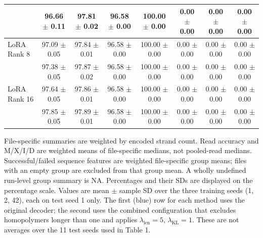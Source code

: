 \documentclass[10pt,letterpaper]{article}
\begin{document}
\begin{table}[!htb]
{\begin{tabular}{lccccccc}
 & 96.66 $\pm$ 0.11 & 97.81 $\pm$ 0.02 & 96.58 $\pm$ 0.00 & 100.00 $\pm$ 0.00 & 0.00 $\pm$ 0.00 & 0.00 $\pm$ 0.00 & 0.00 $\pm$ 0.00 \\
\midrule
LoRA Rank 8 & \cellcolor{blue!15} 97.09 $\pm$ 0.05 & \cellcolor{blue!15} 97.84 $\pm$ 0.01 & \cellcolor{blue!15} 96.58 $\pm$ 0.00 & \cellcolor{blue!15} 100.00 $\pm$ 0.00 & \cellcolor{blue!15} 0.00 $\pm$ 0.00 & \cellcolor{blue!15} 0.00 $\pm$ 0.00 & \cellcolor{blue!15} 0.00 $\pm$ 0.00 \\
 & 97.38 $\pm$ 0.05 & 97.87 $\pm$ 0.02 & 96.58 $\pm$ 0.00 & 100.00 $\pm$ 0.00 & 0.00 $\pm$ 0.00 & 0.00 $\pm$ 0.00 & 0.00 $\pm$ 0.00 \\
\midrule
LoRA Rank 16 & \cellcolor{blue!15} 97.64 $\pm$ 0.05 & \cellcolor{blue!15} 97.86 $\pm$ 0.01 & \cellcolor{blue!15} 96.58 $\pm$ 0.00 & \cellcolor{blue!15} 100.00 $\pm$ 0.00 & \cellcolor{blue!15} 0.00 $\pm$ 0.00 & \cellcolor{blue!15} 0.00 $\pm$ 0.00 & \cellcolor{blue!15} 0.00 $\pm$ 0.00 \\
 & 97.85 $\pm$ 0.05 & 97.89 $\pm$ 0.01 & 96.58 $\pm$ 0.00 & 100.00 $\pm$ 0.00 & 0.00 $\pm$ 0.00 & 0.00 $\pm$ 0.00 & 0.00 $\pm$ 0.00 \\
\bottomrule
\end{tabular}}
\begin{flushleft}\footnotesize File-specific summaries are weighted by encoded strand count. Read accuracy and M/X/I/D are weighted means of file-specific medians, not pooled-read medians. Successful/failed sequence features are weighted file-specific group means; files with an empty group are excluded from that group mean. A wholly undefined run-level group summary is NA. Percentages and their SDs are displayed on the percentage scale. Values are mean $\pm$ sample SD over the three training seeds (1, 2, 42), each on test seed 1 only. The first (blue) row for each method uses the original decoder; the second uses the combined configuration that excludes homopolymers longer than one and applies $\lambda_{\mathrm{len}}=5$, $\lambda_{\mathrm{KL}}=1$. These are not averages over the 11 test seeds used in Table 1.\end{flushleft}
\end{table}
\end{document}
